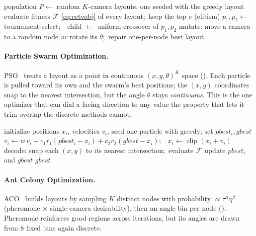 \documentclass{ai-lab-report}
\begin{document}
\begin{algorithm}[H]
\caption{Genetic Algorithm (chromosome $=$ $K$ genes, each a $(node,\theta)$ pair).}
\label{alg:a3ga}
\begin{algorithmic}[1]
\State population $P\gets$ random $K$-camera layouts, one seeded with the greedy layout
  \State evaluate fitness $\mathcal F$ \cref{eq:cctvobj} of every layout;\ keep the top $e$ (elitism)
    \State $p_1,p_2\gets$ tournament-select;\ \ child $\gets$ uniform crossover of $p_1,p_2$
    \State mutate: move a camera to a random node \emph{or} rotate its $\theta$;\ repair one-per-node
  \EndWhile
\EndFor
\State \Return best layout
\end{algorithmic}
\end{algorithm}

\paragraph{Particle Swarm Optimization.}
PSO~\citep{kennedy1995pso} treats a layout as a point in continuous $(x,y,\theta)^K$ space (). Each particle is pulled toward its own and the swarm's best positions; the $(x,y)$ coordinates snap to the nearest intersection, but the angle $\theta$ stays \emph{continuous}. This is the one optimizer that can dial a facing direction to any value the property that lets it trim overlap the discrete methods cannot.

\begin{algorithm}[H]
\caption{Particle Swarm Optimization (particle $=$ continuous $(x,y,\theta)^{K}$, snapped to nearest node).}
\label{alg:a3pso}
\begin{algorithmic}[1]
\State initialize positions $x_i$, velocities $v_i$; seed one particle with greedy; set $pbest_i,gbest$
    \State $v_i\gets w\,v_i+c_1 r_1(pbest_i-x_i)+c_2 r_2(gbest-x_i)$;\ \ $x_i\gets\operatorname{clip}(x_i+v_i)$
    \State decode: snap each $(x,y)$ to its nearest intersection;\ evaluate $\mathcal F$
    \State update $pbest_i$ and $gbest$
  \EndFor
\EndFor
\State \Return $gbest$
\end{algorithmic}
\end{algorithm}

\paragraph{Ant Colony Optimization.}
ACO~\citep{dorigo1996antsystem} builds layouts by sampling $K$ distinct nodes with probability $\propto\tau^\alpha\eta^\beta$ (pheromone $\times$ single-camera desirability), then an angle bin per node (). Pheromone reinforces good regions across iterations, but its angles are drawn from $8$ fixed bins again discrete.
\end{document}
